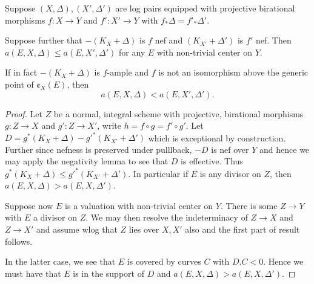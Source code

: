 %

\begin{lemma}\label{l:increase-discr}
	Suppose $(X,\Delta),(X',\Delta')$ are log pairs equipped with projective birational morphisms $f:X \to Y$ and $f':X'\to Y$ with $f_{*}\Delta=f'_{*}\Delta'$.
	
	Suppose further that $-(K_{X}+\Delta)$ is $f$ nef and $(K_{X'}+\Delta')$ is $f'$ nef. Then $a(E,X,\Delta) \leq a(E,X',\Delta')$ for any $E$ with non-trivial center on $Y$.
	
	If in fact $-(K_X+\Delta)$ is $f$-ample and $f$ is not an isomorphism above the generic point of $\cent_X(E)$, then
	$$ a(E, X, \Delta ) < a(E, X', \Delta').$$
\end{lemma}
\begin{proof}
	Let $Z$ be a normal, integral scheme with projective, birational morphisms $g:Z \to X$ and $g':Z \to X'$, write $h=f \circ g=f' \circ g'$. Let $D= g^{*}(K_{X}+\Delta)-g'^{*}(K_{X'}+\Delta')$ which is exceptional by construction. Further since nefness is preserved under pulllback, $-D$ is nef over $Y$ and hence we may apply the negativity lemma to see that $D$ is effective. Thus $g^{*}(K_{X}+\Delta) \leq g'^{*}(K_{X'}+\Delta')$. In particular if $E$ is any divisor on $Z$, then $a(E,X,\Delta) > a(E,X,\Delta')$.
	
	Suppose now $E$ is a valuation with non-trivial center on $Y$. There is some $Z \to Y$ with $E$ a divisor on $Z$. We may then resolve the indeterminacy of $Z \to X$ and $Z \to X'$ and assume wlog that $Z$ lies over $X,X'$ also and the first part of result follows.
	
	In the latter case, we see that $E$ is covered by curves $C$ with $D.C <0$. Hence we must have that $E$ is in the support of $D$ and $a(E,X,\Delta) > a(E,X,\Delta')$.
\end{proof}

